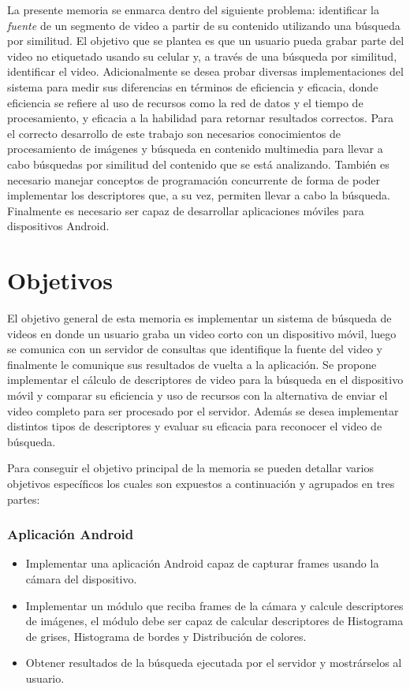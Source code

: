 La presente memoria se enmarca dentro del siguiente problema: identificar la \emph{fuente} de un segmento de video a partir de su contenido utilizando una búsqueda por similitud. El objetivo que se plantea es que un usuario pueda grabar parte del video no etiquetado usando su celular y, a través de una búsqueda por similitud, identificar el video. 
Adicionalmente se desea probar diversas implementaciones del sistema para medir sus diferencias en términos de eficiencia y eficacia, donde eficiencia se refiere al uso de recursos como la red de datos y el tiempo de procesamiento, y eficacia a la habilidad para retornar resultados correctos. Para el correcto desarrollo de este trabajo son necesarios conocimientos de procesamiento de imágenes y búsqueda en contenido multimedia para llevar a cabo búsquedas por similitud del contenido que se está analizando. También es necesario manejar conceptos de programación concurrente de forma de poder implementar los descriptores que, a su vez, permiten llevar a cabo la búsqueda. Finalmente es necesario ser capaz de desarrollar aplicaciones móviles para dispositivos Android.

\section{Objetivos} \label{objetivos}

El objetivo general de esta memoria es implementar un sistema de búsqueda de videos en donde un usuario graba un video corto con un dispositivo móvil, luego se comunica con un servidor de consultas que identifique la fuente del video y finalmente le comunique sus resultados de vuelta a la aplicación. Se propone implementar el cálculo de descriptores de video para la búsqueda en el dispositivo móvil y comparar su eficiencia y uso de recursos con la alternativa de enviar el video completo para ser procesado por el servidor. Además se desea implementar distintos tipos de descriptores y evaluar su eficacia para reconocer el video de búsqueda.

Para conseguir el objetivo principal de la memoria se pueden detallar varios objetivos específicos los cuales son expuestos a continuación y agrupados en tres partes: 
\subsubsection*{Aplicación Android}
\begin{itemize}
\item Implementar una aplicación Android capaz de capturar frames usando la cámara del dispositivo.
\item Implementar un módulo que reciba frames de la cámara y calcule descriptores de imágenes, el módulo debe ser capaz de calcular descriptores de Histograma de grises, Histograma de bordes y Distribución de colores.
\item Obtener resultados de la búsqueda ejecutada por el servidor y mostrárselos al usuario.
\end{itemize}
